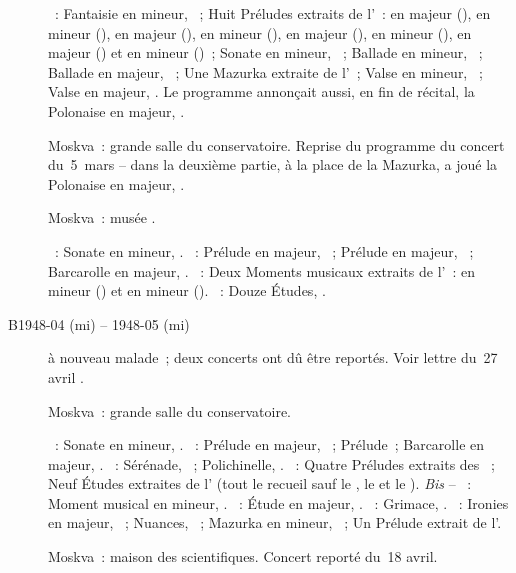 \begin{description}
 \textsc{\Chopin{}}~: Fantaisie en \kF mineur, ~; Huit Préludes
 extraits de l'~: en \kD \Flat majeur (), en \kB \Flat
 mineur (), en \kA \Flat majeur (), en \kF mineur
 (), en \kE \Flat majeur (), en \kC mineur
 (), en \kB \Flat majeur () et en \kG mineur
 ()~; Sonate en \kB \Flat mineur, ~; Ballade en \kF
 mineur, ~; Ballade en \kA \Flat majeur, ~; Une Mazurka
 extraite de l'~; Valse en \kC \Sharp mineur, 
 ~; Valse en \kD \Flat majeur,  .
 Le programme annonçait aussi, en fin de récital, la Polonaise en \kA \Flat
 majeur, .
 \item[\DateWithWeekDay{1948-03-26}]
 Moskva~: grande salle du conservatoire.
 Reprise du programme du concert \Chopin{} du~5~mars -- dans la deuxième
 partie, à la place de la Mazurka, \VSofronitsky{} a joué la Polonaise en
 \kA \Flat majeur, .
 \item[\DateWithWeekDay{1948-04-11}]
 Moskva~: musée \Scriabine{}.

 \textsc{\Glazounov{}}~: Sonate en \kB \Flat mineur, .
 \textsc{\Liadov{}}~: Prélude en \kD \Flat majeur,  ~;
 Prélude en \kF \Sharp majeur,  ~; Barcarolle en \kF
 \Sharp majeur, .
 \textsc{\Rachmaninov{}}~: Deux Moments musicaux extraits de l'~:
 en \kE mineur () et en \kE \Flat mineur ().
 \textsc{\Scriabine{}}~: Douze Études, .
 \item[B1948-04 (mi) -- 1948-05 (mi)]
 \VSofronitsky{} à nouveau malade~; deux concerts ont dû être reportés.
 Voir lettre du~27 avril \citep[p.~168]{Nekrasova08}.
 \item[\DateWithWeekDay{1948-05-19}]
 Moskva~: grande salle du conservatoire.

 \textsc{\Glazounov{}}~: Sonate en \kB \Flat mineur, .
 \textsc{\Liadov{}}~: Prélude en \kD \Flat majeur,  ~;
 Prélude~; Barcarolle en \kF \Sharp majeur, .
 \textsc{\Rachmaninov{}}~: Sérénade,  ~; Polichinelle,
  .
 \textsc{\Scriabine{}}~: Quatre Préludes extraits des ~;
 Neuf Études extraites de l' (tout le recueil sauf le , le
  et le ).
 \emph{Bis} -- \textsc{\Rachmaninov{}}~: Moment musical en \kE \Flat mineur,
  .
 \textsc{\Scriabine{}}~: Étude en \kD \Flat majeur,  .
 \textsc{\Liadov{}}~: Grimace,  .
 \textsc{\Scriabine{}}~: Ironies en \kC majeur,  ~;
 Nuances,  ~; Mazurka en \kE mineur, 
 ~; Un Prélude extrait de l'.
 \item[\DateWithWeekDay{1948-05-23}]
 Moskva~: maison des scientifiques.
 Concert reporté du~18 avril.


\end{description}
